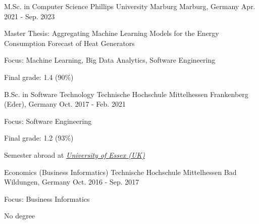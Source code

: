 

\begin{cventries}

   \cventry
      {M.Sc. in Computer Science} %
      {Phillips University Marburg} %
      {Marburg, Germany} %
      {Apr. 2021 - Sep. 2023} %
      {
          \begin{cvitems} %
              \item {Master Thesis: Aggregating Machine Learning Models for the Energy Consumption Forecast of Heat Generators}
              \item {Focus: Machine Learning, Big Data Analytics, Software Engineering}
              \item {Final grade: 1.4 (90\%)}
          \end{cvitems}
      }
  \cventry
    {B.Sc. in Software Technology} %
    {Technische Hochschule Mittelhessen} %
    {Frankenberg (Eder), Germany} %
    {Oct. 2017 - Feb. 2021} %
    {
      \begin{cvitems} %
        \item {Focus: Software Engineering}
        \item {Final grade: 1.2 (93\%)}
        \item {Semester abroad at \textit{\href{https://www.essex.ac.uk/}{University of Essex (UK)}}}
      \end{cvitems}
    }

    \cventry
    {Economics (Business Informatics)} %
    {Technische Hochschule Mittelhessen} %
    {Bad Wildungen, Germany} %
    {Oct. 2016 - Sep. 2017} %
    {
        \begin{cvitems} %
            \item {Focus: Business Informatics}
            \item {No degree}
        \end{cvitems}
    }

\end{cventries}
